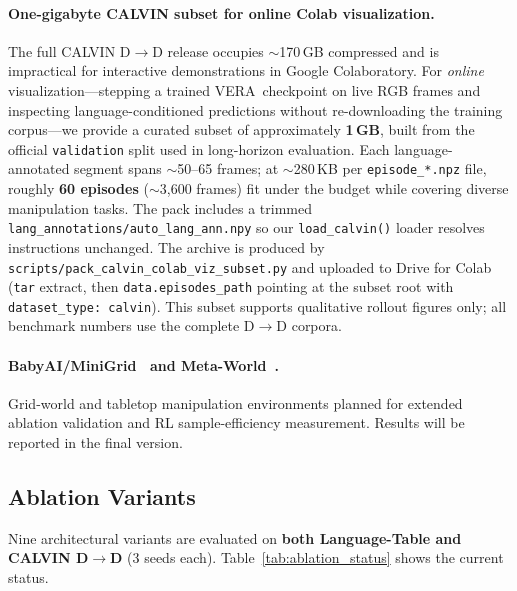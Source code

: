 \documentclass{article}
\newcommand{\modelname}{\textsc{VERA}\xspace}
\begin{document}
\paragraph{One-gigabyte CALVIN subset for online Colab visualization.}
The full CALVIN D$\to$D release occupies ${\sim}$170\,GB compressed and is
impractical for interactive demonstrations in Google Colaboratory.
For \emph{online} visualization---stepping a trained \modelname\ checkpoint on
live RGB frames and inspecting language-conditioned predictions without
re-downloading the training corpus---we provide a curated subset of
approximately \textbf{1\,GB}, built from the official \texttt{validation} split
used in long-horizon evaluation.
Each language-annotated segment spans ${\sim}$50--65 frames; at ${\sim}$280\,KB
per \texttt{episode\_*.npz} file, roughly \textbf{60 episodes}
(${\sim}$3{,}600 frames) fit under the budget while covering diverse
manipulation tasks.
The pack includes a trimmed \texttt{lang\_annotations/auto\_lang\_ann.npy} so our
\texttt{load\_calvin()} loader resolves instructions unchanged.
The archive is produced by
\texttt{scripts/pack\_calvin\_colab\_viz\_subset.py} and uploaded to Drive for
Colab (\texttt{tar} extract, then \texttt{data.episodes\_path} pointing at the
subset root with \texttt{dataset\_type: calvin}).
This subset supports qualitative rollout figures only; all benchmark numbers
use the complete D$\to$D corpora.

\paragraph{BabyAI/MiniGrid~\citep{chevalier2019babyai,minigrid} and
Meta-World~\citep{yu2020metaworld}.}
Grid-world and tabletop manipulation environments planned for extended
ablation validation and RL sample-efficiency measurement.
Results will be reported in the final version.

\subsection{Ablation Variants}
\label{sec:ablation_status}

Nine architectural variants are evaluated on \textbf{both Language-Table and
CALVIN D$\to$D} (3 seeds each).
Table~\ref{tab:ablation_status} shows the current status.
\end{document}
